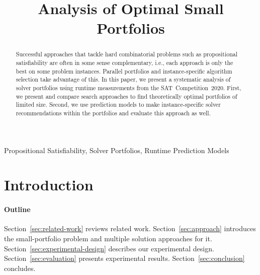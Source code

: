 \documentclass[conference]{IEEEtran}
\begin{document}
\title{Analysis of Optimal Small Portfolios}

\author{
\and
{}
}

\maketitle

\begin{abstract}
Successful approaches that tackle hard combinatorial problems such as propositional satisfiability are often in some sense complementary, i.e., each approach is only the best on some problem instances.
Parallel portfolios and instance-specific algorithm selection take advantage of this.
In this paper, we present a systematic analysis of solver portfolios using runtime measurements from the SAT~Competition~2020.
First, we present and compare search approaches to find theoretically optimal portfolios of limited size.
Second, we use prediction models to make instance-specific solver recommendations within the portfolios and evaluate this approach as well.
\end{abstract}

\begin{IEEEkeywords}
Propositional Satisfiability, Solver Portfolios, Runtime Prediction Models
\end{IEEEkeywords}

\section{Introduction}
\label{sec:introduction}

\paragraph{Outline}

Section~\ref{sec:related-work} reviews related work.
Section~\ref{sec:approach} introduces the small-portfolio problem and multiple solution approaches for it.
Section~\ref{sec:experimental-design} describes our experimental design.
Section~\ref{sec:evaluation} presents experimental results.
Section~\ref{sec:conclusion} concludes.
\end{document}
